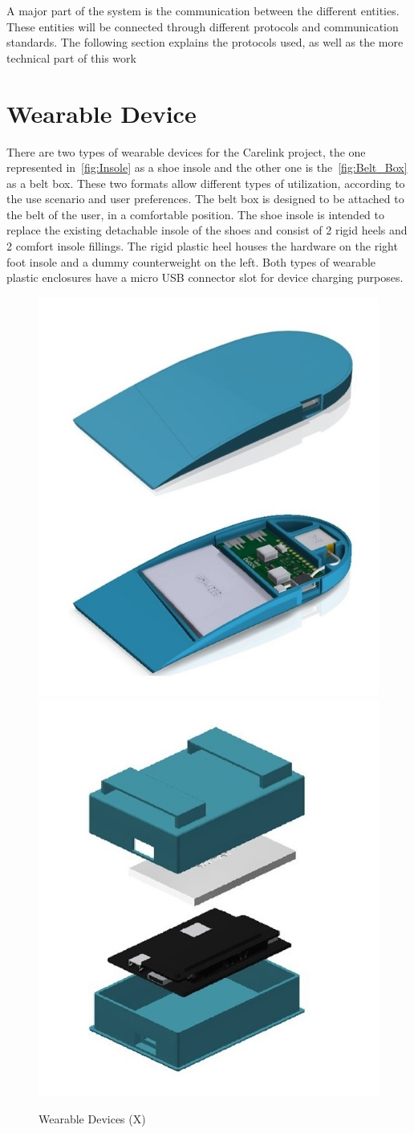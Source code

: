 A major part of the system is the communication between the different entities.
These entities will be connected through different protocols and communication standards. The following section explains the protocols used, as well as the more technical part of this work

\section{Wearable Device} %
\label{sec:Wearrable_Device}
There are two types of wearable devices for the Carelink project, the one represented in~\ref{fig:Insole} as a shoe insole and the other one is the~\ref{fig:Belt_Box} as a belt box. 
These two formats allow different types of utilization, according to the use scenario and user preferences.  
The belt box is designed to be attached to the belt of the user, in a comfortable position.
The shoe insole is intended to replace the existing detachable insole of the shoes and consist of 2 rigid heels and 2 comfort insole fillings. The rigid plastic heel houses the hardware on the right foot insole and a dummy counterweight on the left.
Both types of wearable plastic enclosures have a micro USB connector slot for device charging purposes.
\begin{figure}[htbp]
  \centering
    {\includegraphics[width=0.45\linewidth]{Chapters/Figures/hardware11.jpg}}%
    {\includegraphics[width=0.4\linewidth]{Chapters/Figures/hardware2.jpg}}%
  \caption{Wearable Devices (X)}
  \label{fig:Wearable_Devices}
\end{figure}


